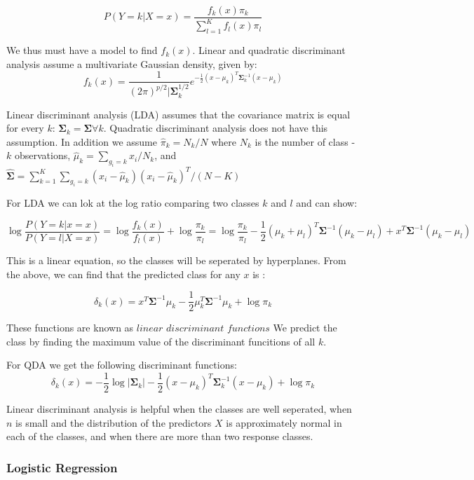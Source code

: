 \documentclass[12pt,twoside]{reedthesis}
\theoremstyle{definition}
\theoremstyle{definition}
\theoremstyle{definition}
\theoremstyle{remark}
\begin{document}
\[ P(Y = k | X = x) = \frac{f_k(x)\pi_k}{\sum_{l = 1}^Kf_l(x)\pi_l}\]

We thus must have a model to find \(f_k(x)\). Linear and quadratic
discriminant analysis assume a multivariate Gaussian density, given by:
\[f_k(x) = \frac{1}{(2\pi)^{p/2}|\mathbf{\Sigma}_k^{1/2}}e^{-\frac{1}{2}(x-\mu_k)^T\mathbf{\Sigma}_k^{-1}(x - \mu_k)}\]

Linear discriminant analysis (LDA) assumes that the covariance matrix is
equal for every \(k\):
\(\mathbf{\Sigma}_k = \mathbf{\Sigma} \forall k\). Quadratic
discriminant analysis does not have this assumption. In addition we
assume \(\hat{\pi}_k = N_k/N\) where \(N_k\) is the number of class -
\(k\) observations, \(\hat{\mu}_k = \sum_{g_i = k}x_i/N_k\), and
\(\mathbf{\hat{\Sigma}} = \sum_{k = 1}^{K}\sum_{g_i = k}(x_i - \hat \mu_k)(x_i - \hat\mu_k)^T / (N- K)\)

For LDA we can lok at the log ratio comparing two classes \(k\) and
\(l\) and can show:

\[\log\frac{P(Y= k|x = x)}{P(Y = l|X = x)} = \log\frac{f_k(x)}{f_l(x)} + \log\frac{\pi_k}{\pi_l} = \log \frac{\pi_k}{\pi_l} - \frac{1}{2}(\mu_k + \mu_l)^T\mathbf{\Sigma}^{-1}(\mu_k- \mu_l) + x^T\mathbf{\Sigma}^{-1}(\mu_k - \mu_l) \]

This is a linear equation, so the classes will be seperated by
hyperplanes. From the above, we can find that the predicted class for
any \(x\) is :

\[ \delta_k(x) = x^T\mathbf{\Sigma}^{-1}\mu_k - \frac{1}{2}\mu_k^T\mathbf{\Sigma}^{-1}\mu_k + \log \pi_k \]

These functions are known as \(\textit{linear discriminant functions}\)
We predict the class by finding the maximum value of the discriminant
funcitions of all \(k\).

For QDA we get the following discriminant functions:
\[ \delta_k(x) = -\frac{1}{2}\log|\mathbf{\Sigma}_k| - \frac{1}{2}(x - \mu_k)^T\mathbf{\Sigma}_k^{-1}(x - \mu_k) + \log \pi_k \]

Linear discriminant analysis is helpful when the classes are well
seperated, when \(n\) is small and the distribution of the predictors
\(X\) is approximately normal in each of the classes, and when there are
more than two response classes.

\subsubsection{Logistic Regression}\label{logistic-regression}
\end{document}
